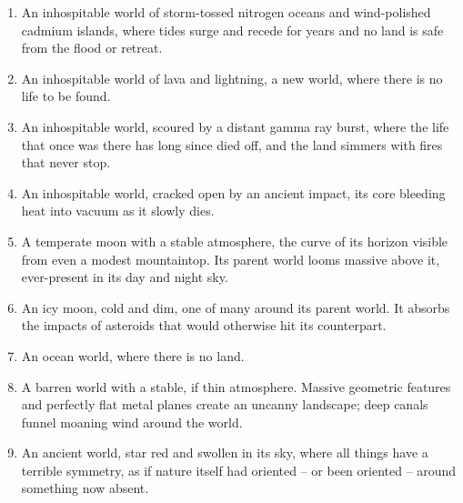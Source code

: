\begin{enumerate}
    \item  An inhospitable world of storm-tossed nitrogen oceans and wind-polished cadmium islands, where tides surge and recede for years and no land is safe from the flood or retreat.
    \item  An inhospitable world of lava and lightning, a new world, where there is no life to be found.
    \item  An inhospitable world, scoured by a distant gamma ray burst, where the life that once was there has long since died off, and the land simmers with fires that never stop.
    \item  An inhospitable world, cracked open by an ancient impact, its core bleeding heat into vacuum as it slowly dies.
    \item  A temperate moon with a stable atmosphere, the curve of its horizon visible from even a modest mountaintop. Its parent world looms massive above it, ever-present in its day and night sky.
    \item  An icy moon, cold and dim, one of many around its parent world. It absorbs the impacts of asteroids that would otherwise hit its counterpart.
    \item  An ocean world, where there is no land.
    \item  A barren world with a stable, if thin atmosphere. Massive geometric features and perfectly flat metal planes create an uncanny landscape; deep canals funnel moaning wind around the world.
    \item  An ancient world, star red and swollen in its sky, where all things have a terrible symmetry, as if nature itself had oriented -- or been oriented -- around something now absent.
\end{enumerate}

